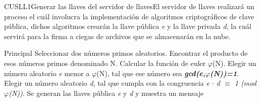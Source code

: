 


\begin{UseCase}{CUSLL1}{Generar las llaves del servidor de llaves}{El servidor de llaves realizará un proceso el cuál involucra la implementación de algoritmos criptográficos de clave pública, dichos algoritmos crearán la  llave pública \textit{e} y la llave privada \textit{d}, la cuál servirá para la firma a ciegas de archivos que se almacenarán en la nube.}

				
\end{UseCase}


\begin{UCtrayectoria}{Principal}
	\UCpaso Seleccionar dos números primos aleatorios.  \label{CUSLL1Regreso}
	\UCpaso Encontrar el producto de esos números primos denominado N.
	\UCpaso Calcular la función de euler $\varphi$(N).
	\UCpaso Elegir un número aleatorio \textit{e} menor a $\varphi$(N), tal que ese número sea \textbf{\textit{gcd(e,$\varphi$(N))=1}}.  \label{CUSLL1Regreso2}
	\UCpaso Elegir un número aleatorio \textit{d}, tal que cumpla con la congruencia  \textit{e $\cdot$ d $\equiv$ 1 (mod $\varphi$(N))}.  \label{CUSLL1Regreso3}
	\UCpaso Se generan las llaves pública \textit{e} y \textit{d} y muestra un mensaje 
\end{UCtrayectoria}

